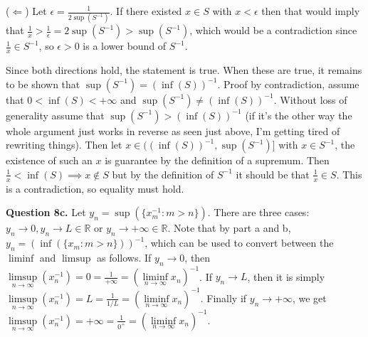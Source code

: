 \documentclass[letterpaper, reqno,11pt]{article}
\begin{document}
($\Leftarrow$) Let $\epsilon= \frac{1}{2\sup(S^{-1})}$. If there existed $x\in S$ with $x<\epsilon$ then that would imply that $\frac{1}{x}>\frac{1}{\epsilon}=2\sup(S^{-1})>\sup(S^{-1})$, which would be a contradiction since $\frac{1}{x}\in S^{-1}$, so $\epsilon>0$ is a lower bound of $S^{-1}$.

Since both directions hold, the statement is true. When these are true, it remains to be shown that $\sup(S^{-1})=\left( \inf(S) \right) ^{-1}$. Proof by contradiction, assume that $0<\inf(S)<+\infty$ and $\sup(S^{-1})\neq (\inf(S))^{-1}$. Without loss of generality assume that $\sup(S^{-1})>\left( \inf(S) \right) ^{-1}$ (if it's the other way the whole argument just works in reverse as seen just above, I'm getting tired of rewriting things). Then let $x\in ( (\inf(S))^{-1}, \sup(S^{-1}) ] $ with $x\in S^{-1}$, the existence of such an $x$ is guarantee by the definition of a supremum. Then $\frac{1}{x}<\inf(S)\implies x\notin S$ but by the definition of $S^{-1}$ it should be that $\frac{1}{x}\in S$. This is a contradiction, so equality must hold.

{\medskip\noindent\bf Question 8c.} Let $y_n=\sup(\{x_m^{-1}: m>n\})$. There are three cases: $y_n\to 0, y_n\to L\in \mathbb{R}$ or $y_n\to +\infty\in \mathbb{R}$. Note that by part a and b, $y_n=\left(\inf(\{x_m: m>n\})\right)^{-1}$, which can be used to convert between the $\liminf$ and $\limsup$ as follows. If $y_n\to 0$, then $\limsup\limits_{n\to\infty}(x_n^{-1})=0=\frac{1}{+\infty}=\left( \liminf\limits_{n\to\infty} x_n \right)^{-1}$. If $y_n\to L$, then it is simply $\limsup\limits_{n\to\infty}(x_n^{-1})=L=\frac{1}{1 /L}=\left( \liminf\limits_{n\to\infty} x_n \right)^{-1}$. Finally if $y_n\to +\infty$, we get $\limsup\limits_{n\to\infty}(x_n^{-1})=+\infty=\frac{1}{0^{+}}=\left( \liminf\limits_{n\to\infty} x_n \right)^{-1}$.

\newpage\phantom{blabla}
\newpage
\end{document}
